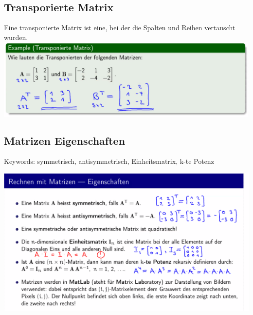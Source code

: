 \documentclass[12pt]{scrartcl}
\begin{document}
\newpage
\subsection{Transporierte Matrix}
Eine transponierte Matrix ist eine, bei der die Spalten und Reihen vertauscht wurden.\\

\includegraphics[width=15cm]{img/transponierte_matrix.png}

\subsection{Matrizen Eigenschaften}
Keywords: symmetrisch, antisymmetrisch, Einheitsmatrix, k-te Potenz

\includegraphics[width=16cm]{img/matrizen_eigenschaften.png}


\newpage
\end{document}
